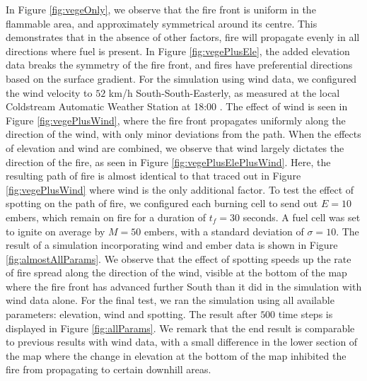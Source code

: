 \noindent In Figure \ref{fig:vegeOnly}, we observe that the fire front is uniform in the flammable area, and approximately symmetrical around its centre. This demonstrates that in the absence of other factors, fire will propagate evenly in all directions where fuel is present. In Figure \ref{fig:vegePlusEle}, the added elevation data breaks the symmetry of the fire front, and fires have preferential directions based on the surface gradient.\newline \indent
For the simulation using wind data, we configured the wind velocity to $52$ km/h South-South-Easterly, as measured at the local Coldstream Automatic Weather Station at 18:00 \cite{RoyalCommission}. The effect of wind is seen in Figure \ref{fig:vegePlusWind}, where the fire front propagates uniformly along the direction of the wind, with only minor deviations from the path. When the effects of elevation and wind are combined, we observe that wind largely dictates the direction of the fire, as seen in Figure \ref{fig:vegePlusElePlusWind}. Here, the resulting path of fire is almost identical to that traced out in Figure \ref{fig:vegePlusWind} where wind is the only additional factor. \newline \indent
To test the effect of spotting on the path of fire, we configured each burning cell to send out $E=10$ embers, which remain on fire for a duration of $t_f = 30$ seconds. A fuel cell was set to ignite on average by $M=50$ embers, with a standard deviation of $\sigma=10$. The result of a simulation incorporating wind and ember data is shown in Figure \ref{fig:almostAllParams}. We observe that the effect of spotting speeds up the rate of fire spread along the direction of the wind, visible at the bottom of the map where the fire front has advanced further South than it did in the simulation with wind data alone.\newline \indent
For the final test, we ran the simulation using all available parameters: elevation, wind and spotting. The result after $500$ time steps is displayed in Figure \ref{fig:allParams}. We remark that the end result is comparable to previous results with wind data, with a small difference in the lower section of the map where the change in elevation at the bottom of the map inhibited the fire from propagating to certain downhill areas.

